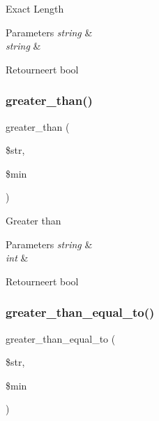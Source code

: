 Exact Length


\begin{DoxyParams}{Parameters}
{\em string} & \\
\hline
{\em string} & \\
\hline
\end{DoxyParams}
\begin{DoxyReturn}{Retourneert}
bool 
\end{DoxyReturn}
\mbox{\label{class_c_i___form__validation_a8dd73c5e1d6880a650bb41e1ec6ee2f4}} 
\subsubsection{\texorpdfstring{greater\_than()}{greater\_than()}}
{\footnotesize\ttfamily greater\+\_\+than (\begin{DoxyParamCaption}\item[{}]{\$str,  }\item[{}]{\$min }\end{DoxyParamCaption})}

Greater than


\begin{DoxyParams}{Parameters}
{\em string} & \\
\hline
{\em int} & \\
\hline
\end{DoxyParams}
\begin{DoxyReturn}{Retourneert}
bool 
\end{DoxyReturn}
\mbox{\label{class_c_i___form__validation_a003319a504eca3e9d1b608f8e48f2daf}} 
\subsubsection{\texorpdfstring{greater\_than\_equal\_to()}{greater\_than\_equal\_to()}}
{\footnotesize\ttfamily greater\+\_\+than\+\_\+equal\+\_\+to (\begin{DoxyParamCaption}\item[{}]{\$str,  }\item[{}]{\$min }\end{DoxyParamCaption})}

